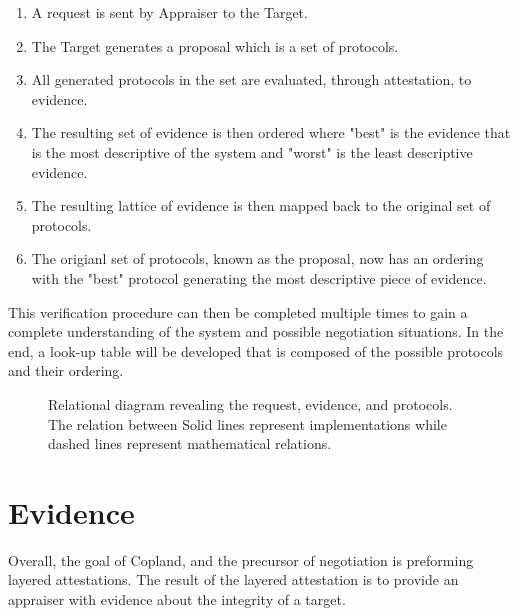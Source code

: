 \documentclass[10pt]{report}
\begin{document}
\begin{enumerate}
\item A request is sent by Appraiser to the Target.
\item The Target generates a proposal which is a set of protocols.
\item All generated protocols in the set are evaluated, through attestation, to evidence. 
\item The resulting set of evidence is then ordered where "best" is the evidence that is the most descriptive of the system and "worst" is the least descriptive evidence. 
\item The resulting lattice of evidence is then mapped back to the original set of protocols. 
\item The origianl set of protocols, known as the proposal, now has an ordering with the "best" protocol generating the most descriptive piece of evidence.
\end{enumerate}

This verification procedure can then be completed multiple times to gain a complete understanding of the system and possible negotiation situations. In the end, a look-up table will be developed that is composed of the possible protocols and their ordering. 

\begin{figure}[hbtp]
  \centering
  
  \caption[Relational Figure]{ Relational diagram revealing the request, evidence, and protocols. The relation between  Solid lines
    represent implementations while dashed lines represent
    mathematical relations.}
  \label{fig:certification-fig}
\end{figure}

\section {Evidence}

Overall, the goal of Copland, and the precursor of negotiation is preforming layered attestations.  The result of the layered attestation is to provide an appraiser with evidence about the integrity of a target. 
\end{document}
